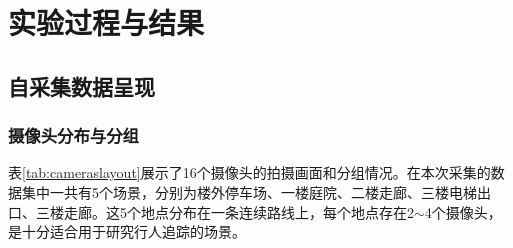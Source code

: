\section{实验过程与结果}
\subsection{自采集数据呈现}

\subsubsection{摄像头分布与分组}

表\ref{tab:cameraslayout}展示了16个摄像头的拍摄画面和分组情况。在本次采集的数据集中一共有5个场景，分别为楼外停车场、一楼庭院、二楼走廊、三楼电梯出口、三楼走廊。这5个地点分布在一条连续路线上，每个地点存在2$\sim$4个摄像头，是十分适合用于研究行人追踪的场景。

